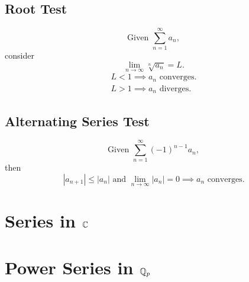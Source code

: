 \subsection*{Root Test}
\[
\text{Given }\sum_{n=1}^{\infty}a_{n},
\]
consider
\[
\lim_{n\to\infty}\sqrt[n]{a_{n}}=L.
\]
\begin{gather*}
    L < 1 \implies a_{n}\text{ converges}.\\
    L > 1 \implies a_{n}\text{ diverges}.
\end{gather*}

\subsection*{Alternating Series Test}
\[
\text{Given }\sum_{n=1}^{\infty}(-1)^{n-1}a_{n},
\]
then
\[
|a_{n+1}|\leq|a_{n}| \text{ and } \lim_{n\to\infty}|a_{n}|=0 \implies a_{n}\text{ converges.}
\]

\section{Series in $\mathbb{C}$}

\section{Power Series in $\mathbb{Q}_{p}$}

